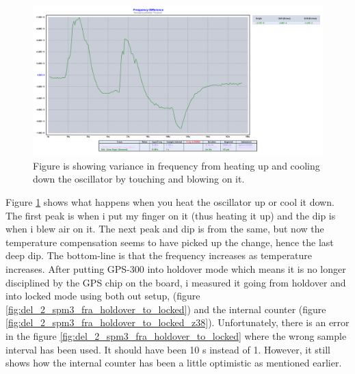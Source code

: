 \documentclass[11pt,english,a4paper]{article}
\begin{document}
\begin{figure}[!htb]
  \centering
    \includegraphics[width=1\textwidth]{del_2_spm2_fbtb_blaas_finger.png}
      \caption{Figure is showing variance in frequency from heating up and cooling down the oscillator by touching and blowing on it.}
          \label{fig:del_2_spm2_fbtb_blaas_finger}
\end{figure}

Figure \ref{fig:del_2_spm2_fbtb_blaas_finger} shows what happens when you heat the oscillator up or cool it down. The first peak is when i put my finger on it (thus heating it up) and the dip is when i blew air on it. The next peak and dip is from the same, but now the temperature compensation seems to have picked up the change, hence the last deep dip. The bottom-line is that the frequency increases as temperature increases. After putting GPS-300 into holdover mode which means it is no longer disciplined by the GPS chip on the board, i measured it going from holdover and into locked mode using both out setup, (figure \ref{fig:del_2_spm3_fra_holdover_to_locked}) and the internal counter (figure \ref{fig:del_2_spm3_fra_holdover_to_locked_z38}). Unfortunately, there is an error in the figure \ref{fig:del_2_spm3_fra_holdover_to_locked} where the wrong sample interval has been used. It should have been 10 s instead of 1. However, it still shows how the internal counter has been a little optimistic as mentioned earlier. 
\end{document}
